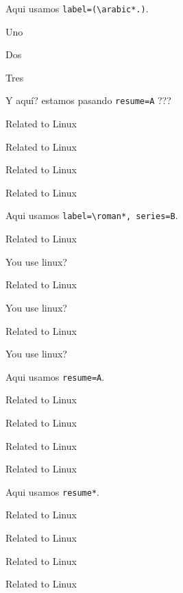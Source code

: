 \documentclass{article}
\begin{document}
Aqui usamos \verb+label=(\arabic*.)+.

\begin{enumext}[label=(\arabic*.),]
  \item Uno
  \item Dos
  \item Tres
\end{enumext}

Y aquí? estamos pasando \verb+resume=A+ ???

\begin{enumext}[resume=A]
  \item Related to Linux
  \item Related to Linux
  \item Related to Linux
  \item Related to Linux
\end{enumext}

Aqui usamos \verb+label=\roman*, series=B+.

\begin{enumext}[label=\roman*, series=B]
  \item Related to Linux
  \item You use linux? %
  \item Related to Linux
  \item You use linux? %
  \item Related to Linux
  \item You use linux? %
\end{enumext}

Aqui usamos \verb+resume=A+.

\begin{enumext}[resume=A]
  \item Related to Linux
  \item Related to Linux
  \item Related to Linux
  \item Related to Linux
\end{enumext}

Aqui usamos \verb+resume*+.

\begin{enumext}[resume]
  \item Related to Linux
  \item Related to Linux
  \item Related to Linux
  \item Related to Linux
\end{enumext}

\stop
\end{document}
